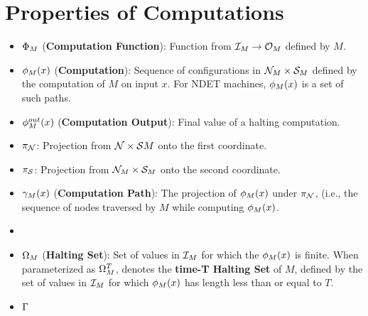 \section{Properties of Computations}
\begin{itemize}
\item $\Phi_M$ (\textbf{Computation Function}): Function from
  $\mathcal{I}_M \rightarrow \mathcal{O}_M$ defined by $M$.
\item $\phi_M(x)$ (\textbf{Computation}): Sequence of
  configurations in $\mathcal{N}_M \times \mathcal{S}_M$ defined by the computation of $M$
  on input $x$.  For NDET machines, $\phi_M(x)$ is a set of such
  paths.
\item $\phi_{M}^{out}(x)$ (\textbf{Computation Output}): Final value
  of a halting computation.
\item $\pi_{\mathcal{N}}$: Projection from $\mathcal{N} \times \mathcal{S}{M}$ onto the
  first coordinate.
\item $\pi_{\mathcal{S}}$: Projection from $\mathcal{N}_M \times \mathcal{S}_M$ onto the
  second coordinate.
\item $\gamma_M(x)$ (\textbf{Computation Path}): The projection
  of $\phi_M(x)$ under $\pi_{\mathcal{N}}$, (i.e., the sequence of
  nodes traversed by $M$ while computing $\phi_M(x)$.
\item 


\item $\Omega_M$ (\textbf{Halting Set}): Set of values in
  $\mathcal{I}_M$ for which the $\phi_M(x)$ is finite.  When
  parameterized as $\Omega_M^T$, denotes the \textbf{time-T Halting
    Set} of $M$, defined by the set of values in $\mathcal{I}_M$ for
  which $\phi_M(x)$ has length less than or equal to $T$.


\item $\Gamma$
\end{itemize}
